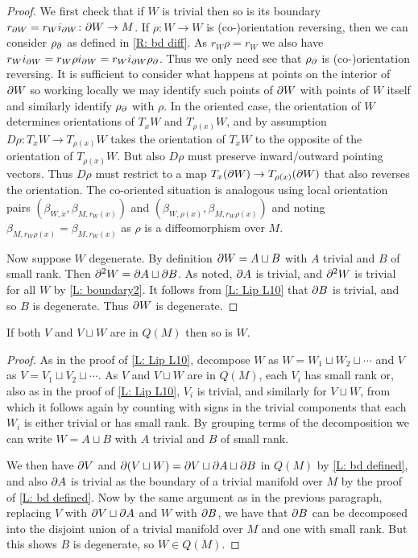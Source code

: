 \begin{proof}
	We first check that if $W$ is trivial then so is its boundary $r_{\partial W} = r_Wi_{\partial W} \colon \partial W \to M$.
	If $\rho \colon W \to W$ is (co\nobreakdash-)orientation reversing, then we can consider $\rho_\partial$ as defined in \cref{R: bd diff}.
	As $r_W\rho = r_W$ we also have $r_Wi_{\partial W} = r_W\rho i_{\partial W} = r_W i_{\partial W} \rho_\partial$.
	Thus we only need see that $\rho_\partial$ is (co\nobreakdash-)orientation reversing.
	It is sufficient to consider what happens at points on the interior of $\partial W$ so working locally we may identify such points of $\partial W$ with points of $W$ itself and similarly identify $\rho_\partial$ with $\rho$.
	In the oriented case, the orientation of $W$ determines orientations of $T_xW$ and $T_{\rho(x)}W$, and by assumption $D\rho: T_xW \to T_{\rho(x)}W$ takes the orientation of $T_xW$ to the opposite of the orientation of $T_{\rho(x)}W$.
	But also $D\rho$ must preserve inward/outward pointing vectors.
	Thus $D\rho$ must restrict to a map $T_x (\partial W) \to T_{\rho(x)}(\partial W)$ that also reverses the orientation.
	The co-oriented situation is analogous using local orientation pairs $\left(\beta_{W,x}, \beta_{M,r_W(x)}\right)$ and $\left(\beta_{W,\rho(x)}, \beta_{M,r_W\rho(x)}\right)$ and noting $\beta_{M,r_W\rho(x)} = \beta_{M,r_W(x)}$ as $\rho$ is a diffeomorphism over $M$.

	Now suppose $W$ degenerate.
	By definition $\partial W = A \sqcup B$ with $A$ trivial and $B$ of small rank.
	Then $\partial^2 W = \partial A \sqcup \partial B$.
	As noted, $\partial A$ is trivial, and $\partial^2 W$ is trivial for all $W$ by \cref{L: boundary2}.
	It follows from \cref{L: Lip L10} that $\partial B$ is trivial, and so $B$ is degenerate.
	Thus $\partial W$ is degenerate.
\end{proof}

\begin{lemma}\label{L: Lipy12}
	If both $V$ and $V \sqcup W$ are in $Q(M)$ then so is $W$.
\end{lemma}

\begin{proof}
	As in the proof of \cref{L: Lip L10}, decompose $W$ as $W = W_1 \sqcup W_2 \sqcup \cdots$ and $V$ as $V = V_1 \sqcup V_2 \sqcup \cdots$.
	As $V$ and $V \sqcup W$ are in $Q(M)$, each $V_i$ has small rank or, also as in the proof of \cref{L: Lip L10}, $V_i$ is trivial, and similarly for $V \sqcup W$, from which it follows again by counting with signs in the trivial components that each $W_i$ is either trivial or has small rank.
	By grouping terms of the decomposition we can write $W = A \sqcup B$ with $A$ trivial and $B$ of small rank.

	We then have $\partial V$ and $\partial (V \sqcup W) = \partial V \sqcup \partial A \sqcup \partial B$ in $Q(M)$ by \cref{L: bd defined}, and also $\partial A$ is trivial as the boundary of a trivial manifold over $M$ by the proof of \cref{L: bd defined}.
	Now by the same argument as in the previous paragraph, replacing $V$ with $\partial V \sqcup \partial A$ and $W$ with $\partial B$, we have that $\partial B$ can be decomposed into the disjoint union of a trivial manifold over $M$ and one with small rank.
	But this shows $B$ is degenerate, so $W \in Q(M)$.
\end{proof}

